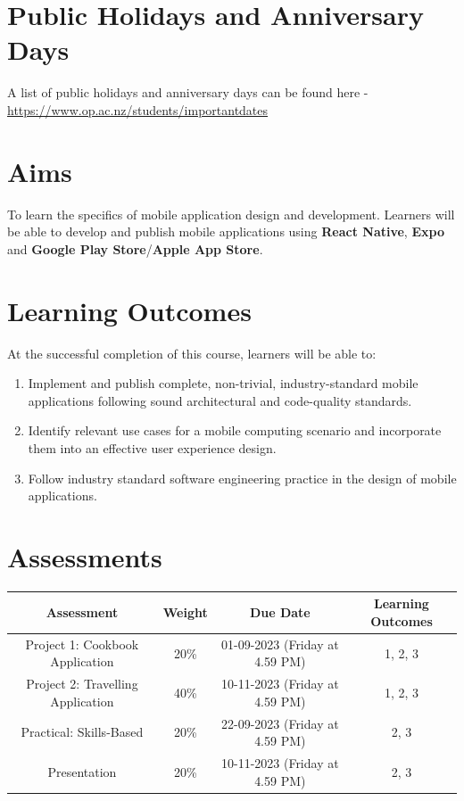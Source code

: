 \documentclass{article}
\begin{document}
\section*{Public Holidays and Anniversary Days}
A list of public holidays and anniversary days can be found here - \href{https://www.op.ac.nz/students/importantdates}{https://www.op.ac.nz/students/importantdates}

\section*{Aims}
To learn the specifics of mobile application design and development. Learners will be able to develop and publish mobile applications using \textbf{React Native}, \textbf{Expo} and \textbf{Google Play Store}/\textbf{Apple App Store}.

\section*{Learning Outcomes}
At the successful completion of this course, learners will be able to:
\begin{enumerate}
	\item Implement and publish complete, non-trivial, industry-standard mobile applications following sound architectural and code-quality standards.
	\item Identify relevant use cases for a mobile computing scenario and incorporate them into an effective user experience design.
	\item Follow industry standard software engineering practice in the design of mobile applications.
\end{enumerate}  

\section*{Assessments}
\renewcommand{\arraystretch}{1.5}
\begin{tabular}{|c|c|c|c|}
	\hline
	\textbf{Assessment} & \textbf{Weight} & \textbf{Due Date}    & \textbf{Learning Outcomes} \\ \hline
	Project 1: Cookbook Application            & 20\%            & 01-09-2023 (Friday at 4.59 PM)  & 1, 2, 3                    \\ \hline
	Project 2: Travelling Application            & 40\%            & 10-11-2023 (Friday at 4.59 PM)  & 1, 2, 3                    \\ \hline
	Practical: Skills-Based           & 20\%            & 22-09-2023 (Friday at 4.59 PM)  & 2, 3                    \\ \hline
	Presentation       & 20\%            & 10-11-2023 (Friday at 4.59 PM) & 2, 3                       \\ \hline
\end{tabular}
\end{document}
